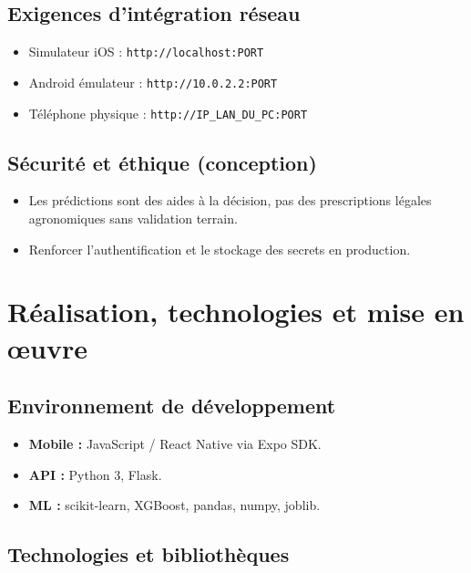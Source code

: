 \documentclass[12pt,a4paper,twoside,openright]{report}
\begin{document}
\section{Exigences d'intégration réseau}

\begin{itemize}
  \item Simulateur iOS : \texttt{http://localhost:PORT}
  \item Android émulateur : \texttt{http://10.0.2.2:PORT}
  \item Téléphone physique : \texttt{http://IP\_LAN\_DU\_PC:PORT}
\end{itemize}

\section{Sécurité et éthique (conception)}

\begin{itemize}
  \item Les prédictions sont des aides à la décision, pas des prescriptions légales agronomiques sans validation terrain.
  \item Renforcer l'authentification et le stockage des secrets en production.
\end{itemize}

\cleardoublepage

\chapter{Réalisation, technologies et mise en œuvre}

\section{Environnement de développement}

\begin{itemize}
  \item \textbf{Mobile :} JavaScript / React Native via Expo SDK.
  \item \textbf{API :} Python 3, Flask.
  \item \textbf{ML :} scikit-learn, XGBoost, pandas, numpy, joblib.
\end{itemize}

\section{Technologies et bibliothèques}
\end{document}
